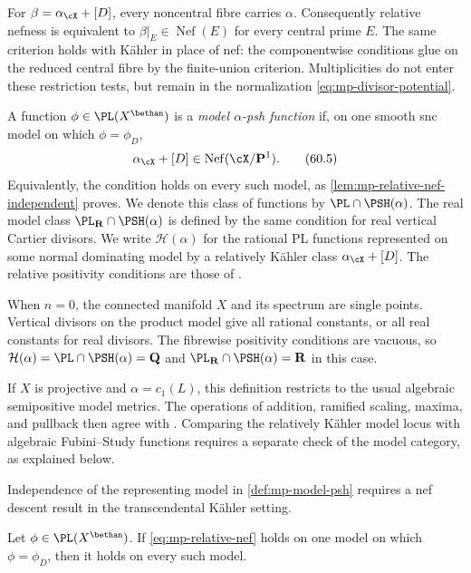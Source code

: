 For $\beta=\alpha_{\cX}+[D]$, every noncentral fibre carries
$\alpha$. Consequently relative nefness is equivalent to
$\beta|_E\in\operatorname{Nef}(E)$ for every central prime
$E$. The same criterion holds with K\"ahler in place of nef:
the componentwise conditions glue on the reduced central fibre
by the finite-union criterion. Multiplicities do not enter
these restriction tests, but remain in the normalization
\eqref{eq:mp-divisor-potential}.

\begin{samepage}
\begin{definition}\label{def:mp-model-psh}
A function $\phi\in\PL(X^{\bethan})$ is a \emph{model
$\alpha$-psh function} if, on one smooth snc model on which
$\phi=\phi_D$,
\[
                   \alpha_{\cX}+[D]\in\operatorname{Nef}(\cX/\mathbf P^1).
\tag{60.5}\label{eq:mp-relative-nef}
\]
Equivalently, the condition holds on every such model, as
\cref{lem:mp-relative-nef-independent} proves. We denote this
class of functions by $\PL\cap\PSH(\alpha)$.
The real model class $\PL_{\mathbf R}\cap\PSH(\alpha)$ is
defined by the same condition for real vertical Cartier divisors.
We write $\mathcal H(\alpha)$ for the rational PL functions
represented on some normal dominating model by a relatively
K\"ahler class $\alpha_{\cX}+[D]$.
The relative positivity conditions are those of
\cite[Definition~4.1.2, p.~33]{MPTropicalV2}.
\end{definition}
\end{samepage}

When $n=0$, the connected manifold $X$ and its spectrum are
single points. Vertical divisors on the product model give
all rational constants, or all real constants for real divisors.
The fibrewise positivity conditions are vacuous, so
$\mathcal H(\alpha)=\PL\cap\PSH(\alpha)=\mathbf Q$ and
$\PL_{\mathbf R}\cap\PSH(\alpha)=\mathbf R$ in this case.

If $X$ is projective and $\alpha=c_1(L)$, this definition restricts to
the usual algebraic semipositive model metrics.  The operations of addition,
ramified scaling, maxima, and pullback then agree with
\cite[Proposition~3.6]{BJ22}.  Comparing the relatively K\"ahler model
locus with algebraic Fubini--Study functions requires a separate check
of the model category, as explained below.

Independence of the representing model in
\cref{def:mp-model-psh} requires a nef descent result in the
transcendental K\"ahler setting.

\begin{lemma}
\label{lem:mp-relative-nef-independent}
Let $\phi\in\PL(X^{\bethan})$.  If \eqref{eq:mp-relative-nef} holds on one
model on which $\phi=\phi_D$, then it holds on every such model.
\end{lemma}

